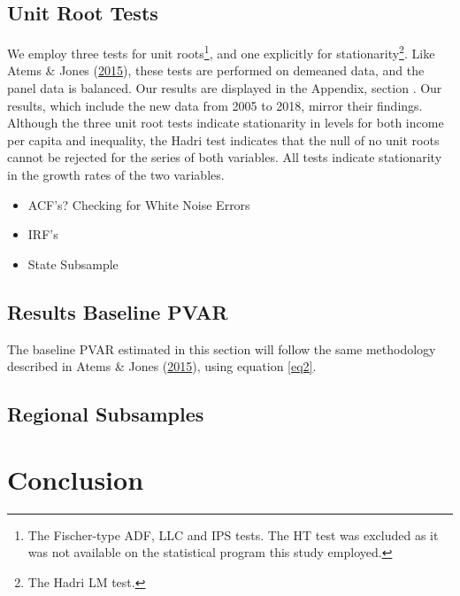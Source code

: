 \documentclass[11pt,preprint, authoryear]{elsarticle}
\numberwithin{equation}{section}
\numberwithin{figure}{section}
\numberwithin{table}{section}
\let\rmarkdownfootnote\footnote%
\def\footnote{\protect\rmarkdownfootnote}
\begin{document}
\hypertarget{unit-root-tests}{%
\subsection{\texorpdfstring{Unit Root Tests
\label{Section 3.2}}{Unit Root Tests }}\label{unit-root-tests}}

We employ three tests for unit roots\footnote{The Fischer-type ADF, LLC
  and IPS tests. The HT test was excluded as it was not available on the
  statistical program this study employed.}, and one explicitly for
stationarity\footnote{The Hadri LM test.}. Like Atems \& Jones
(\protect\hyperlink{ref-atems}{2015}), these tests are performed on
demeaned data, and the panel data is balanced. Our results are displayed
in the Appendix, section . Our results, which include the new
data from 2005 to 2018, mirror their findings. Although the three unit
root tests indicate stationarity in levels for both income per capita
and inequality, the Hadri test indicates that the null of no unit roots
cannot be rejected for the series of both variables. All tests indicate
stationarity in the growth rates of the two variables.

\begin{itemize}
\item
  ACF's? Checking for White Noise Errors
\item
  IRF's
\item
  State Subsample
\end{itemize}

\hypertarget{results-baseline-pvar}{%
\subsection{\texorpdfstring{Results Baseline PVAR
\label{Section 3.3}}{Results Baseline PVAR }}\label{results-baseline-pvar}}

The baseline PVAR estimated in this section will follow the same
methodology described in Atems \& Jones
(\protect\hyperlink{ref-atems}{2015}), using equation \ref{eq2}.

\hypertarget{regional-subsamples}{%
\subsection{\texorpdfstring{Regional Subsamples
\label{Section 3.4}}{Regional Subsamples }}\label{regional-subsamples}}

\hypertarget{conclusion}{%
\section{Conclusion}\label{conclusion}}
\end{document}
